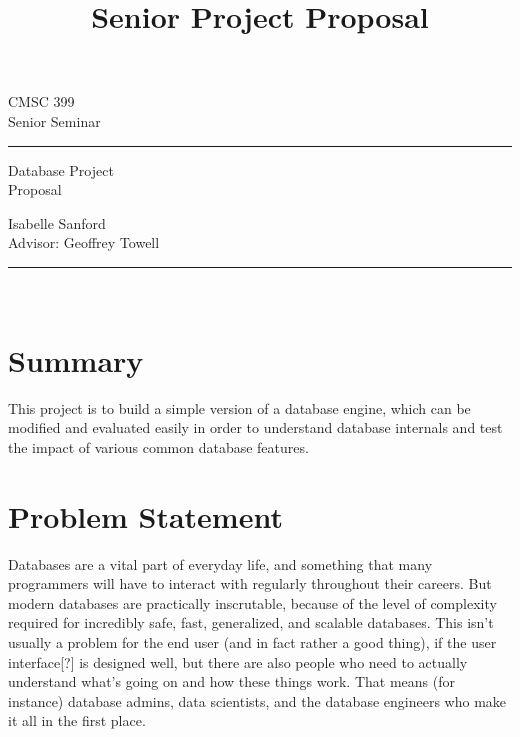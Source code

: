 \documentclass[12pt, oneside]{amsart} %
\begin{document}

\title{Senior Project Proposal} %

\begin{minipage}{0.295\textwidth} %
\raggedright
CMSC 399\\ %
\footnotesize %
Senior Seminar %
\medskip\hrule
\end{minipage}
\begin{minipage}{0.4\textwidth} %
\centering 
\large %
Database Project\\ %
\normalsize 
Proposal \\ %
\end{minipage}
\begin{minipage}{0.295\textwidth} %
\raggedleft
Isabelle Sanford \\%
\footnotesize 
Advisor: Geoffrey Towell
\medskip\hrule
\end{minipage}\\

\section{Summary}

This project is to build a simple version of a database engine, which can be modified and evaluated easily in order to understand database internals and test the impact of various common database features. 


\section{Problem Statement}
Databases are a vital part of everyday life, and something that many programmers will have to interact with regularly throughout their careers. But modern databases are practically inscrutable, because of the level of complexity required for incredibly safe, fast, generalized, and scalable databases. This isn't usually a problem for the end user (and in fact rather a good thing), if the user interface[?] is designed well, but there are also people who need to actually understand what's going on and how these things work. That means (for instance) database admins, data scientists, and the database engineers who make it all in the first place.
\end{document}
